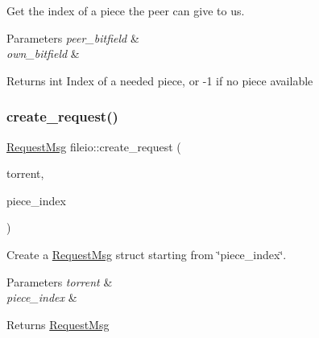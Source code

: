 Get the index of a piece the peer can give to us. 


\begin{DoxyParams}{Parameters}
{\em peer\+\_\+bitfield} & \\
\hline
{\em own\+\_\+bitfield} & \\
\hline
\end{DoxyParams}
\begin{DoxyReturn}{Returns}
int Index of a needed piece, or -\/1 if no piece available 
\end{DoxyReturn}
\mbox{\label{namespacefileio_a6c26bf16806ad09920392d80ca362a5b}} 
\subsubsection{\texorpdfstring{create\+\_\+request()}{create\_request()}}
{\footnotesize\ttfamily \hyperlink{structfileio_1_1RequestMsg}{Request\+Msg} fileio\+::create\+\_\+request (\begin{DoxyParamCaption}\item[{\hyperlink{structtorr_1_1Torrent}{Torrent} \&}]{torrent,  }\item[{int}]{piece\+\_\+index }\end{DoxyParamCaption})}



Create a \hyperlink{structfileio_1_1RequestMsg}{Request\+Msg} struct starting from \char`\"{}piece\+\_\+index\char`\"{}. 


\begin{DoxyParams}{Parameters}
{\em torrent} & \\
\hline
{\em piece\+\_\+index} & \\
\hline
\end{DoxyParams}
\begin{DoxyReturn}{Returns}
\hyperlink{structfileio_1_1RequestMsg}{Request\+Msg} 
\end{DoxyReturn}
\mbox{\label{namespacefileio_a8bc5078bab6b41e8bce7cdd7193c1ff5}} 
